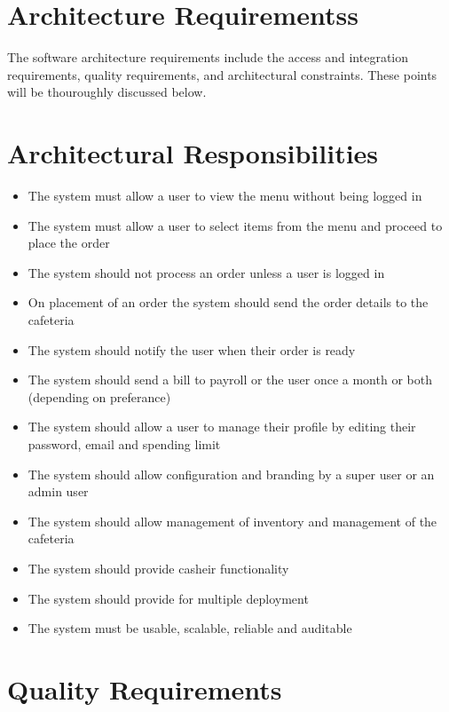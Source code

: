 \documentclass[a4paper,12pt]{article}
\begin{document}
\section{Architecture Requirementss}
The software architecture requirements include the access and integration requirements, quality
requirements, and architectural constraints. These points will be thouroughly discussed below.

\section{Architectural Responsibilities}
\begin{itemize}
\item The system must allow a user to view the menu without being logged in
\item The system must allow a user to select items from the menu and proceed to place the order
\item The system should not process an order unless a user is logged in
\item On placement of an order the system should send the order details to the cafeteria
\item The system should notify the user when their order is ready
\item The system should send a bill to payroll or the user  once a month or both (depending on preferance)
\item The system should allow a user to manage their profile by editing their password, email and spending limit
\item The system should allow configuration and branding by a super user or an  admin user
\item The system should allow management of inventory and management of the cafeteria
\item The system should provide casheir functionality
\item The system should provide for multiple deployment
\item The system must be usable, scalable, reliable and auditable
\end{itemize}

\section{Quality Requirements}
\end{document}
